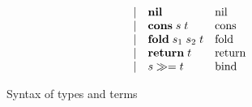 \begin{figure}
\begin{subfigure}[t]{0.48\linewidth}
\[\begin{array}{lllll}
    \\
    && \mid &
    \mathbf{nil}
    &
    \text{nil}
    \\
    && \mid &
    \mathbf{cons}\;s\;t
    &
    \text{cons}
    \\
    && \mid &
    \mathbf{fold}\;s_1\;s_2\;t
    &
    \text{fold}
    \\
    && \mid &
    \mathbf{return}\;t
    &
    \text{return}
    \\
    && \mid &
    {s}\gg={t}
    &
    \text{bind}
  \end{array}
  \]
  \end{subfigure}
  \caption{Syntax of types and terms}
  \label{fig:syntax}
\end{figure}
